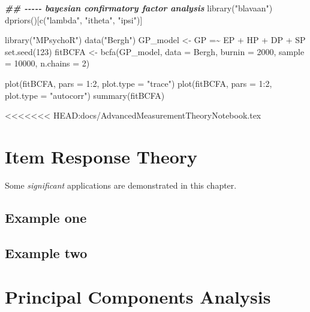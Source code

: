 \documentclass[
]{book}
\newenvironment{Shaded}{\begin{snugshade}}{\end{snugshade}}
\newcommand{\AttributeTok}[1]{\textcolor[rgb]{0.77,0.63,0.00}{#1}}
\newcommand{\DecValTok}[1]{\textcolor[rgb]{0.00,0.00,0.81}{#1}}
\newcommand{\DocumentationTok}[1]{\textcolor[rgb]{0.56,0.35,0.01}{\textbf{\textit{#1}}}}
\newcommand{\FunctionTok}[1]{\textcolor[rgb]{0.00,0.00,0.00}{#1}}
\newcommand{\NormalTok}[1]{#1}
\newcommand{\OtherTok}[1]{\textcolor[rgb]{0.56,0.35,0.01}{#1}}
\newcommand{\SpecialCharTok}[1]{\textcolor[rgb]{0.00,0.00,0.00}{#1}}
\newcommand{\StringTok}[1]{\textcolor[rgb]{0.31,0.60,0.02}{#1}}
\begin{document}
\begin{Shaded}
\begin{Highlighting}[]
\DocumentationTok{\#\# {-}{-}{-}{-}{-} bayesian confirmatory factor analysis}
\FunctionTok{library}\NormalTok{(}\StringTok{"blavaan"}\NormalTok{)}
\FunctionTok{dpriors}\NormalTok{()[}\FunctionTok{c}\NormalTok{(}\StringTok{"lambda"}\NormalTok{, }\StringTok{"itheta"}\NormalTok{, }\StringTok{"ipsi"}\NormalTok{)]}

\FunctionTok{library}\NormalTok{(}\StringTok{"MPsychoR"}\NormalTok{)}
\FunctionTok{data}\NormalTok{(}\StringTok{"Bergh"}\NormalTok{)}
\NormalTok{GP\_model }\OtherTok{\textless{}{-}} \StringTok{\textquotesingle{}GP =\textasciitilde{} EP + HP + DP + SP\textquotesingle{}}
\FunctionTok{set.seed}\NormalTok{(}\DecValTok{123}\NormalTok{)}
\NormalTok{fitBCFA }\OtherTok{\textless{}{-}} \FunctionTok{bcfa}\NormalTok{(GP\_model, }\AttributeTok{data =}\NormalTok{ Bergh, }\AttributeTok{burnin =} \DecValTok{2000}\NormalTok{, }\AttributeTok{sample =} \DecValTok{10000}\NormalTok{, }\AttributeTok{n.chains =} \DecValTok{2}\NormalTok{)}

\FunctionTok{plot}\NormalTok{(fitBCFA, }\AttributeTok{pars =} \DecValTok{1}\SpecialCharTok{:}\DecValTok{2}\NormalTok{, }\AttributeTok{plot.type =} \StringTok{"trace"}\NormalTok{)}
\FunctionTok{plot}\NormalTok{(fitBCFA, }\AttributeTok{pars =} \DecValTok{1}\SpecialCharTok{:}\DecValTok{2}\NormalTok{, }\AttributeTok{plot.type =} \StringTok{"autocorr"}\NormalTok{)}
\FunctionTok{summary}\NormalTok{(fitBCFA)}
\end{Highlighting}
\end{Shaded}

<<<<<<< HEAD:docs/AdvancedMeasurementTheoryNotebook.tex
\hypertarget{item-response-theory}{%
\chapter{Item Response Theory}\label{item-response-theory}}

Some \emph{significant} applications are demonstrated in this chapter.

\hypertarget{example-one}{%
\section{Example one}\label{example-one}}

\hypertarget{example-two}{%
\section{Example two}\label{example-two}}

\hypertarget{principal-components-analysis-1}{%
\chapter{Principal Components Analysis}\label{principal-components-analysis-1}}
\end{document}
